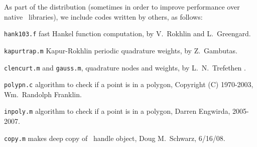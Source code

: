 \documentclass[12pt]{article}
\begin{document}
As part of the distribution (sometimes in order to
improve performance over native \matlab\ libraries),
we include codes written by others, as follows:
\bi
\item {\tt hank103.f} fast Hankel function computation, by
V.~Rokhlin and L.~Greengard.
\item {\tt kapurtrap.m} Kapur-Rokhlin periodic quadrature weights,
by Z.~Gambutas.
\item {\tt clencurt.m} and {\tt gauss.m}, quadrature nodes and weights,
by L.~N.~Trefethen \cite{tref}.
\item {\tt polypn.c} algorithm to check if a point is in a polygon,
Copyright (C) 1970-2003, Wm.~Randolph Franklin.
\item {\tt inpoly.m} algorithm to check if a point is in a polygon,
Darren Engwirda, 2005-2007.
\item {\tt copy.m} makes deep copy of \matlab\ handle object,
Doug M.~Schwarz, 6/16/08.
\ei


 

\end{document}
